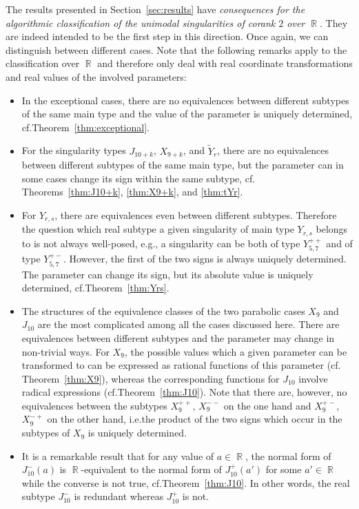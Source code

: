 \documentclass[noend]{amsproc}
\theoremstyle{definition}
\newcommand{\tY}{\widetilde{Y}}
\DeclareMathOperator{\R}{\mathbb{R}}
\begin{document}
The results presented in Section~\ref{sec:results} have \emph{consequences for
the algorithmic classification of the unimodal singularities of corank $2$ over
$\R$}. They are indeed intended to be the first step in this direction. Once
again, we can distinguish between different cases. Note that the following
remarks apply to the classification over $\R$ and therefore only deal with real
coordinate transformations and real values of the involved parameters:
\begin{itemize}
\item
In the exceptional cases, there are no equivalences between different subtypes
of the same main type and the value of the parameter is uniquely determined,
cf.\@ Theorem~\ref{thm:exceptional}.
\item
For the singularity types $J_{10+k}$, $X_{9+k}$, and $\tY_r$, there are no
equivalences between different subtypes of the same main type, but the
parameter can in some cases change its sign within the same subtype, cf.\@
Theorems~\ref{thm:J10+k}, \ref{thm:X9+k}, and \ref{thm:tYr}.
\item
For $Y_{r,s}$, there are equivalences even between different subtypes.
Therefore the question which real subtype a given singularity of main type
$Y_{r,s}$ belongs to is not always well-posed, e.g., a singularity can be both
of type $Y_{5,7}^{++}$ and of type $Y_{5,7}^{+-}$. However, the first of the
two signs is always uniquely determined. The parameter can change its sign, but
its absolute value is uniquely determined, cf.\@ Theorem~\ref{thm:Yrs}.
\item
The structures of the equivalence classes of the two parabolic cases $X_9$ and
$J_{10}$ are the most complicated among all the cases discussed here. There are
equivalences between different subtypes and the parameter may change in
non-trivial ways. For $X_9$, the possible values which a given parameter can be
transformed to can be expressed as rational functions of this parameter (cf.\@
Theorem~\ref{thm:X9}), whereas the corresponding functions for $J_{10}$ involve
radical expressions (cf.\@ Theorem~\ref{thm:J10}). Note that there are,
however, no equivalences between the subtypes $X_9^{++}$, $X_9^{--}$ on the one
hand and $X_9^{+-}$, $X_9^{-+}$ on the other hand, i.e.\@ the product of the
two signs which occur in the subtypes of $X_9$ is uniquely determined.
\item
It is a remarkable result that for any value of $a \in \R$, the normal form of
$J_{10}^-(a)$ is $\R$-equivalent to the normal form of $J_{10}^+(a')$ for some
$a' \in \R$ while the converse is not true, cf.\@ Theorem~\ref{thm:J10}. In
other words, the real subtype $J_{10}^-$ is redundant whereas $J_{10}^+$ is
not.
\end{itemize}
\end{document}
